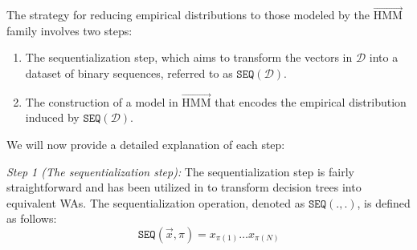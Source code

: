


The strategy for reducing empirical distributions to those modeled by the $\overrightarrow{\text{HMM}}$ family involves two steps:

\begin{enumerate}
    \item The sequentialization step, which aims to transform the vectors in $\mathcal{D}$ into a dataset of binary sequences, referred to as $\texttt{SEQ}(\mathcal{D})$.
    \item The construction of a  model in $\overrightarrow{\text{HMM}}$ that encodes the empirical distribution induced by $\texttt{SEQ}(\mathcal{D})$.  
\end{enumerate}

We will now provide a detailed explanation of each step:

\emph{Step 1 (The sequentialization step):} The sequentialization step is fairly straightforward and has been utilized in \cite{marzouk24a} to transform decision trees into equivalent WAs. The sequentialization operation, denoted as $\texttt{SEQ}(.,.)$, is defined as follows:
$$\texttt{SEQ}(\overrightarrow{x}, \pi) = x_{\pi(1)} \ldots x_{\pi(N)}$$


